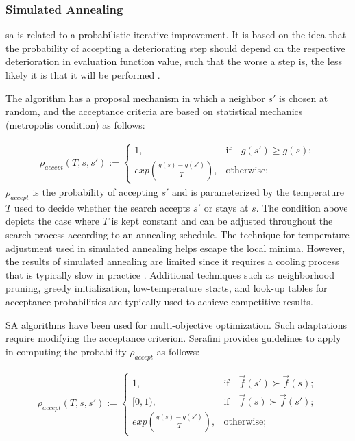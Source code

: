 \subsubsection{Simulated Annealing}
\Gls{sa} is related to a probabilistic iterative improvement. It is based on the idea that the probability of accepting a deteriorating step should depend on the respective deterioration in evaluation function value, such that the worse a step is, the less likely it is that it will be performed \parencite{HolgerH2005StochasticSearch}.

The algorithm has a proposal mechanism in which a neighbor $s'$ is chosen at random, and the acceptance criteria are based on statistical mechanics (metropolis condition) as follows:

\begin{align*}
    \rho_{accept}(T,s,s') := \begin{cases}
                            1, &\text{if}\quad g(s') \geq g(s);\\
                            exp(\frac{g(s)-g(s')}{T}), &\text{otherwise};
                             \end{cases}
\end{align*}
$\rho_{accept}$ is the probability of accepting $s'$ and is parameterized by the temperature $T$ used to decide whether the search accepts $s'$ or stays at $s$. The condition above depicts the case where $T$ is kept constant and can be adjusted throughout the search process according to an annealing schedule. The technique for temperature adjustment used in simulated annealing helps escape the local minima. However, the results of simulated annealing are limited since it requires a cooling process that is typically slow in practice \parencite{HolgerH2005StochasticSearch}. Additional techniques such as neighborhood pruning, greedy initialization, low-temperature starts, and look-up tables for acceptance probabilities are typically used to achieve competitive results.

SA algorithms have been used for multi-objective optimization. Such adaptations require modifying the acceptance criterion.  Serafini \parencite{Serafini1994SimulatedProblems} provides guidelines to apply in computing the probability $\rho_{accept}$ as follows:

\begin{align*}
    \rho_{accept}(T,s,s') := \begin{cases}
                            1, &\text{if}\quad \Vec{f}(s') \succ \Vec{f}(s);\\
                            [0,1), &\text{if}\quad \Vec{f}(s) \succ \Vec{f}(s');\\
                            exp(\frac{g(s)-g(s')}{T}), &\text{otherwise};
                             \end{cases}
\end{align*}



